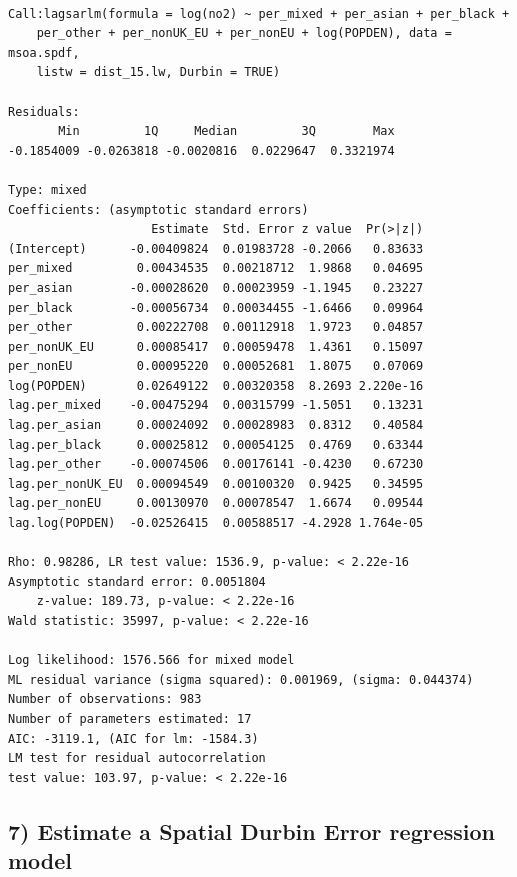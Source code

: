 \documentclass[
  letterpaper,
]{scrbook}
\begin{document}
\begin{verbatim}

Call:lagsarlm(formula = log(no2) ~ per_mixed + per_asian + per_black + 
    per_other + per_nonUK_EU + per_nonEU + log(POPDEN), data = msoa.spdf, 
    listw = dist_15.lw, Durbin = TRUE)

Residuals:
       Min         1Q     Median         3Q        Max 
-0.1854009 -0.0263818 -0.0020816  0.0229647  0.3321974 

Type: mixed 
Coefficients: (asymptotic standard errors) 
                    Estimate  Std. Error z value  Pr(>|z|)
(Intercept)      -0.00409824  0.01983728 -0.2066   0.83633
per_mixed         0.00434535  0.00218712  1.9868   0.04695
per_asian        -0.00028620  0.00023959 -1.1945   0.23227
per_black        -0.00056734  0.00034455 -1.6466   0.09964
per_other         0.00222708  0.00112918  1.9723   0.04857
per_nonUK_EU      0.00085417  0.00059478  1.4361   0.15097
per_nonEU         0.00095220  0.00052681  1.8075   0.07069
log(POPDEN)       0.02649122  0.00320358  8.2693 2.220e-16
lag.per_mixed    -0.00475294  0.00315799 -1.5051   0.13231
lag.per_asian     0.00024092  0.00028983  0.8312   0.40584
lag.per_black     0.00025812  0.00054125  0.4769   0.63344
lag.per_other    -0.00074506  0.00176141 -0.4230   0.67230
lag.per_nonUK_EU  0.00094549  0.00100320  0.9425   0.34595
lag.per_nonEU     0.00130970  0.00078547  1.6674   0.09544
lag.log(POPDEN)  -0.02526415  0.00588517 -4.2928 1.764e-05

Rho: 0.98286, LR test value: 1536.9, p-value: < 2.22e-16
Asymptotic standard error: 0.0051804
    z-value: 189.73, p-value: < 2.22e-16
Wald statistic: 35997, p-value: < 2.22e-16

Log likelihood: 1576.566 for mixed model
ML residual variance (sigma squared): 0.001969, (sigma: 0.044374)
Number of observations: 983 
Number of parameters estimated: 17 
AIC: -3119.1, (AIC for lm: -1584.3)
LM test for residual autocorrelation
test value: 103.97, p-value: < 2.22e-16
\end{verbatim}

\hypertarget{estimate-a-spatial-durbin-error-regression-model}{%
\subsection*{7) Estimate a Spatial Durbin Error regression
model}\label{estimate-a-spatial-durbin-error-regression-model}}
\end{document}

